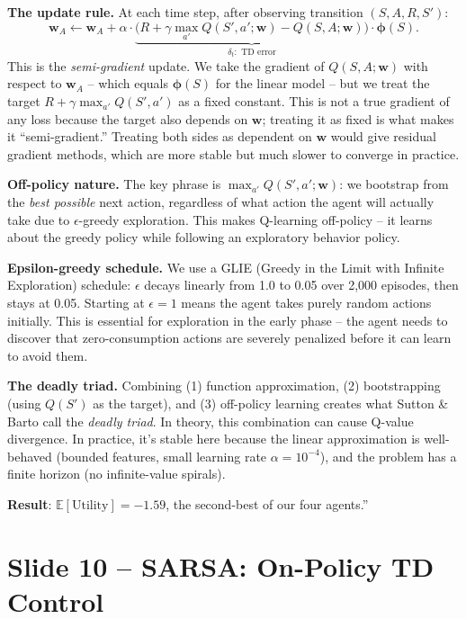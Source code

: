 \documentclass[11pt, letterpaper]{article}
\begin{document}
\textbf{The update rule.} At each time step, after observing transition $(S, A, R, S')$:
\[
\mathbf{w}_A \leftarrow \mathbf{w}_A + \alpha \cdot \underbrace{\bigl(R + \gamma \max_{a'} Q(S', a'; \mathbf{w}) - Q(S, A; \mathbf{w})\bigr)}_{\delta_t: \text{ TD error}} \cdot \boldsymbol{\phi}(S).
\]
This is the \emph{semi-gradient} update. We take the gradient of $Q(S,A;\mathbf{w})$ with respect to $\mathbf{w}_A$ -- which equals $\boldsymbol{\phi}(S)$ for the linear model -- but we treat the target $R + \gamma \max_{a'} Q(S', a')$ as a fixed constant. This is not a true gradient of any loss because the target also depends on $\mathbf{w}$; treating it as fixed is what makes it ``semi-gradient.'' Treating both sides as dependent on $\mathbf{w}$ would give residual gradient methods, which are more stable but much slower to converge in practice.

\textbf{Off-policy nature.} The key phrase is $\max_{a'} Q(S', a'; \mathbf{w})$: we bootstrap from the \emph{best possible} next action, regardless of what action the agent will actually take due to $\epsilon$-greedy exploration. This makes Q-learning off-policy -- it learns about the greedy policy while following an exploratory behavior policy.

\textbf{Epsilon-greedy schedule.} We use a GLIE (Greedy in the Limit with Infinite Exploration) schedule: $\epsilon$ decays linearly from 1.0 to 0.05 over 2,000 episodes, then stays at 0.05. Starting at $\epsilon = 1$ means the agent takes purely random actions initially. This is essential for exploration in the early phase -- the agent needs to discover that zero-consumption actions are severely penalized before it can learn to avoid them.

\textbf{The deadly triad.} Combining (1) function approximation, (2) bootstrapping (using $Q(S')$ as the target), and (3) off-policy learning creates what Sutton \& Barto call the \emph{deadly triad}. In theory, this combination can cause Q-value divergence. In practice, it's stable here because the linear approximation is well-behaved (bounded features, small learning rate $\alpha = 10^{-4}$), and the problem has a finite horizon (no infinite-value spirals).

\textbf{Result}: $\mathbb{E}[\text{Utility}] = -1.59$, the second-best of our four agents.''

\section{Slide 10 -- SARSA: On-Policy TD Control}
\end{document}
